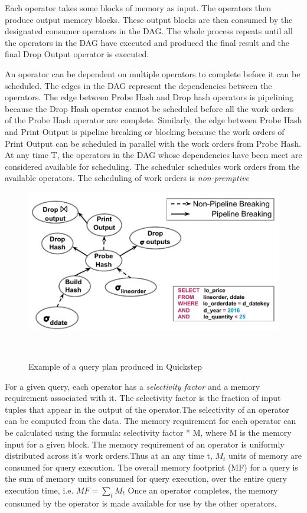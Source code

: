 \documentclass[20pt]{sigchi}
\begin{document}
Each operator takes some blocks of memory as input. The operators then produce output memory blocks. These output blocks are then consumed by the designated consumer operators in the DAG. 
The whole process repeats until all the operators in the DAG have executed and produced the final result and the final Drop Output operator is executed. 

 An operator can be dependent on multiple operators to complete before it can be scheduled.
The edges in the DAG represent the dependencies between the operators. 
The edge between Probe Hash and Drop hash operators is pipelining because the  Drop Hash operator cannot be scheduled before all the work orders of the Probe Hash operator are complete. 
Similarly, the edge between Probe Hash and Print Output is pipeline breaking or blocking because the work orders of Print Output can be scheduled in parallel with the work orders from Probe Hash. 
At any time T, the operators in the DAG whose dependencies have been meet are considered available for scheduling.
The scheduler schedules work orders from the available operators. The  scheduling of work orders is \textit{non-premptive}
\begin{figure}[ht]

\centering
  \includegraphics[width=0.9\columnwidth]{figures/QueryPlan}

  \caption{Example of a  query plan produced in Quickstep}~\label{fig:figure1}
  \vspace{-2.0em}
\end{figure}
\vspace{-0.6em}
For a given query, each operator has a \textit{selectivity factor} and a memory requirement associated with it. The selectivity factor is the fraction of input tuples that appear in the output of the operator.The selectivity of an operator can be computed from the data. 
The memory requirement for each operator can be calculated using the formula:  selectivity factor * M, where M is the memory input for a given block. 
The memory requirement of an operator is uniformly distributed across it's work orders.Thus at an any time t, $M_{t}$ units of memory are consumed for query execution. 
The overall memory footprint (MF)  for a query is the sum of  memory units consumed for query execution, over the entire query execution time, i.e. $MF = \sum \limits_{t} M_{t}$
Once an operator completes, the memory consumed by the operator is made available for use by the other operators. 
\vspace{-0.6em}
\end{document}
